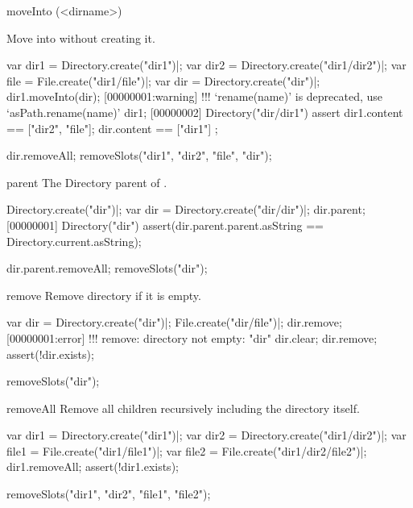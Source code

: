 \begin{urbiscriptapi}
\item[moveInto](<dirname>)
  \experimental{}

  Move \this into  without creating it.
\begin{urbiscript}[firstnumber=1]
var dir1 = Directory.create("dir1")|;
var dir2 = Directory.create("dir1/dir2")|;
var file = File.create("dir1/file")|;
var dir = Directory.create("dir")|;
dir1.moveInto(dir);
[00000001:warning] !!! `rename(name)' is deprecated, use `asPath.rename(name)'
dir1;
[00000002] Directory("dir/dir1")
assert
{
  dir1.content == ["dir2", "file"];
  dir.content == ["dir1"]
};
\end{urbiscript}
\begin{urbicomment}
dir.removeAll;
removeSlots("dir1", "dir2", "file", "dir");
\end{urbicomment}


\item[parent]
  The Directory parent of \this.
\begin{urbiscript}
Directory.create("dir")|;
var dir = Directory.create("dir/dir")|;
dir.parent;
[00000001] Directory("dir")
assert(dir.parent.parent.asString == Directory.current.asString);
\end{urbiscript}
\begin{urbicomment}
dir.parent.removeAll;
removeSlots("dir");
\end{urbicomment}


\item[remove]
  Remove \this directory if it is empty.
\begin{urbiscript}
var dir = Directory.create("dir")|;
File.create("dir/file")|;
dir.remove;
[00000001:error] !!! remove: directory not empty: "dir"
dir.clear;
dir.remove;
assert(!dir.exists);
\end{urbiscript}
\begin{urbicomment}
removeSlots("dir");
\end{urbicomment}


\item[removeAll]
  Remove all children recursively including the directory itself.
\begin{urbiscript}
var dir1 = Directory.create("dir1")|;
var dir2 = Directory.create("dir1/dir2")|;
var file1 = File.create("dir1/file1")|;
var file2 = File.create("dir1/dir2/file2")|;
dir1.removeAll;
assert(!dir1.exists);
\end{urbiscript}
\begin{urbicomment}
removeSlots("dir1", "dir2", "file1", "file2");
\end{urbicomment}



\end{urbiscriptapi}
